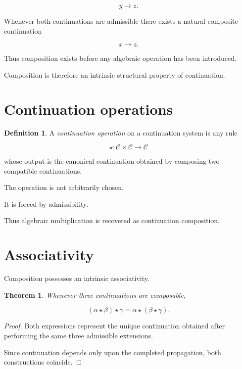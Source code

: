 \documentclass[13pt,openany]{book}
\theoremstyle{plain}
\newtheorem{theorem}{Theorem}[chapter]
\theoremstyle{definition}
\newtheorem{definition}{Definition}[chapter]
\begin{document}
\[
y
\longrightarrow
z.
\]

Whenever both continuations are admissible there exists a natural composite continuation

\[
x
\longrightarrow
z.
\]

Thus composition exists before any algebraic operation has been introduced.

Composition is therefore an intrinsic structural property of continuation.

\section{Continuation operations}

\begin{definition}

A \emph{continuation operation} on a continuation system is any rule

\[
\star :
\mathcal C\times\mathcal C
\rightarrow
\mathcal C
\]

whose output is the canonical continuation obtained by composing two compatible continuations.

\end{definition}

The operation is not arbitrarily chosen.

It is forced by admissibility.

Thus algebraic multiplication is recovered as continuation composition.

\section{Associativity}

Composition possesses an intrinsic associativity.

\begin{theorem}

Whenever three continuations are composable,

\[
(\alpha\star\beta)\star\gamma
=
\alpha\star(\beta\star\gamma).
\]

\end{theorem}

\begin{proof}

Both expressions represent the unique continuation obtained after performing the same three admissible extensions.

Since continuation depends only upon the completed propagation, both constructions coincide.

\end{proof}
\end{document}
